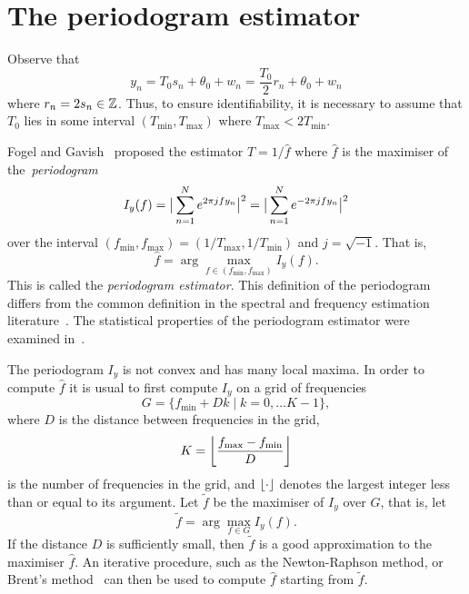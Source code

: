 \documentclass[10pt,twocolumn,twoside]{IEEEtran}
\begin{document}
\section{The periodogram estimator}\label{sec:peri-estim}

Observe that
\[
y_n = T_0 s_n + \theta_0 + w_n = \frac{T_0}{2} r_n + \theta_0 + w_n
\]
where $r_n = 2s_n \in {\mathbb Z}$.  Thus, to ensure identifiability, it is necessary to assume that $T_0$ lies in some interval $(T_{\text{min}}, T_{\text{max}})$ where $T_{\text{max}} < 2T_{\text{min}}$.%


Fogel and Gavish~\cite{Fogel1988,Fogel1989_bit_synch_zero_crossings} proposed the estimator $\hat{T} = 1/\hat{f}$ where $\hat{f}$ is the maximiser of the~\emph{periodogram}
\[
I_y(f) = \big\vert  \sum_{n=1}^N e^{ 2\pi j f y_n}  \big\vert^2 = \big\vert  \sum_{n=1}^N e^{ -2\pi j f y_n}  \big\vert^2 
\]
over the interval $(f_{\text{min}}, f_{\text{max}}) = (1/T_{\text{max}}, 1/T_{\text{min}})$ and $j = \sqrt{-1}$.  That is,
\[
\hat{f} = \arg\max_{f \in (f_{\text{min}}, f_{\text{max}})} I_y(f).
\] 
This is called the \emph{periodogram estimator}.  This definition of the periodogram differs from the common definition in the spectral and frequency estimation literature~\cite{Hannan_time_series_1967,Quinn2001}.  The statistical properties of the periodogram estimator were examined in~\cite{Quinn20013asilomar_period_est}.

The periodogram $I_y$ is not convex and has many local maxima.  In order to compute $\hat{f}$ it is usual to first compute $I_y$ on a grid of frequencies
\[
G = \{ f_{\text{min}} + Dk \mid k = 0, \dots K-1 \},
\]
where $D$ is the distance between frequencies in the grid, 
\[
K =  {\left\lfloor \frac{f_{\text{max}} - f_{\text{min}}}{D} \right\rfloor}
\]
is the number of frequencies in the grid, and ${\left\lfloor \cdot \right\rfloor}$ denotes the largest integer less than or equal to its argument.  
Let $\widetilde{f}$ be the maximiser of $I_y$ over $G$, that is, let
\[
\widetilde{f} = \arg\max_{f \in G} I_y(f).
\]
If the distance $D$ is sufficiently small, then $\widetilde{f}$ is a good approximation to the maximiser $\hat{f}$.  An iterative procedure, such as the Newton-Raphson method, or Brent's method~\cite{Brent_opt_no_derivs_1973} 
can then be used to compute $\hat{f}$ starting from $\widetilde{f}$.
\end{document}

